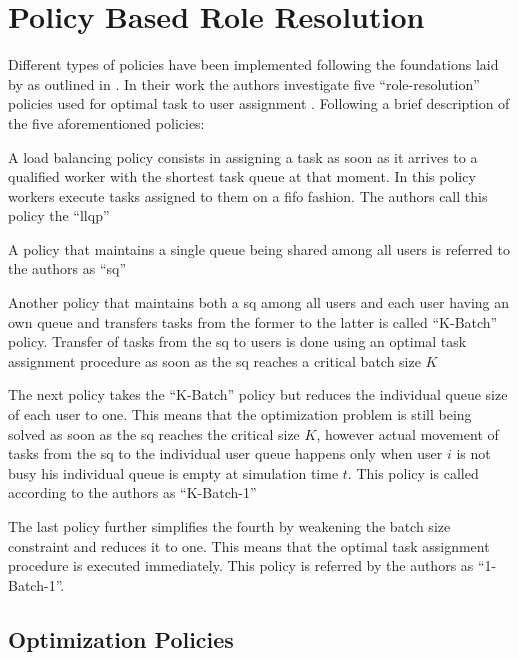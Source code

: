 \chapter{Policy Based Role Resolution}
\label{ch:policies}

Different types of policies have been implemented following the foundations laid by \citet{Zeng2005} as outlined in . In their work the authors investigate five ``role-resolution'' policies used for optimal task to user assignment \citep[p. 7]{Zeng2005}. Following a brief description of the five aforementioned policies:
\begin{enumerate*}
	\item A load balancing policy consists in assigning a task as soon as it arrives to a qualified worker with the shortest task queue at that moment. In this policy workers execute tasks assigned to them on a \gls{fifo} fashion. The authors call this policy the ``\gls{llqp}''
	\item A policy that maintains a single queue being shared among all users is referred to the authors as ``\gls{sq}''
	\item Another policy that maintains both a \gls{sq} among all users and each user having an own queue and transfers tasks from the former to the latter is called ``K-Batch'' policy. Transfer of tasks from the \gls{sq} to users is done using an optimal task assignment procedure as soon as the \gls{sq} reaches a critical batch size $K$
	\item The next policy takes the ``K-Batch'' policy but reduces the individual queue size of each user to one. This means that the optimization problem is still being solved as soon as the \gls{sq} reaches the critical size $K$, however actual movement of tasks from the \gls{sq} to the individual user queue happens only when user $i$ is not busy \ie his individual queue is empty at simulation time $t$. This policy is called according to the authors as ``K-Batch-1''
	\item The last policy further simplifies the fourth by weakening the batch size constraint and reduces it to one. This means that the optimal task assignment procedure is executed immediately. This policy is referred by the authors as ``1-Batch-1''.
\end{enumerate*}

\section{Optimization Policies}
\label{sec:opt_policies}


